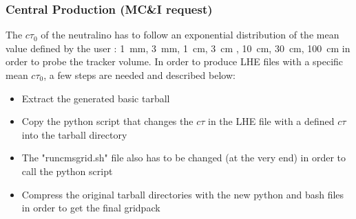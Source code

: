 \documentclass{cernatlasnote}
\begin{document}
\subsubsection{Central Production (MC\&I request)}
    The $c\tau_0$ of the neutralino has to follow an exponential distribution of the mean value defined by the user : 1~mm, 3~mm, 1~cm, 3~cm , 10~cm, 30~cm, 100~cm in order to probe the tracker volume. In order to produce LHE files with a specific mean $c\tau_0$, a few steps are needed and described below:
        \begin{itemize}
            \item Extract the generated basic tarball 
            \item Copy the python script that changes the $c\tau$ in the LHE file with a defined $c\tau$ into the tarball directory
            \item The "runcmsgrid.sh" file also has to be changed (at the very end) in order to call the python script
            \item Compress the original tarball directories with the new python and bash files in order to get the final gridpack
        \end{itemize}
\newpage
\end{document}
